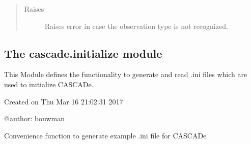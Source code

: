 \documentclass[a4paper,11pt,english]{sphinxmanual}
\begin{document}
\begin{fulllineitems}
\begin{fulllineitems}
\begin{quote}
\begin{description}
\item[{Raises}] \leavevmode
{} \textendash{} Raises error in case the observation type is not recognized.

\end{description}\end{quote}

\end{fulllineitems}


\end{fulllineitems}



\subsection{The cascade.initialize module}
\label{\detokenize{cascade.initialize:module-cascade.initialize.initialize}}\label{\detokenize{cascade.initialize:the-cascade-initialize-module}}\label{\detokenize{cascade.initialize::doc}}
This Module defines the functionality to generate and read .ini files which
are used to initialize CASCADe.

Created on Thu Mar 16 21:02:31 2017

@author: bouwman

\begin{fulllineitems}
\label{\detokenize{cascade.initialize:cascade.initialize.initialize.generate_default_initialization}}
Convenience function to generate example .ini file for CASCADe

\end{fulllineitems}

\end{document}
